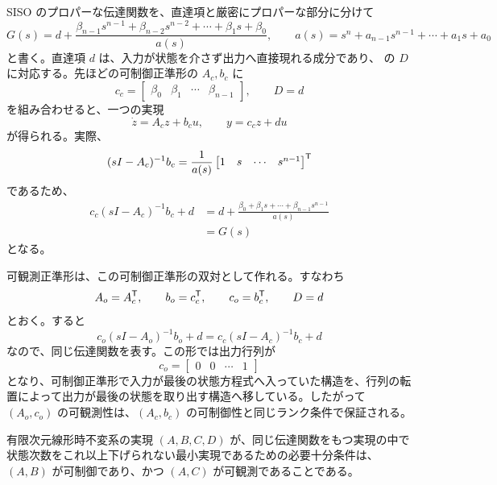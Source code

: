 SISO のプロパーな伝達関数を、直達項と厳密にプロパーな部分に分けて
\begin{equation}
  G(s)=d+
  \frac{\beta_{n-1}s^{n-1}+\beta_{n-2}s^{n-2}+\cdots+\beta_1s+\beta_0}
       {a(s)},\qquad
  a(s)=s^n+a_{n-1}s^{n-1}+\cdots+a_1s+a_0
  \label{eq:proper-transfer-split}
\end{equation}
と書く。直達項 $d$ は、入力が状態を介さず出力へ直接現れる成分であり、 の $D$ に対応する。先ほどの可制御正準形の $A_c,b_c$ に
\begin{equation}
  c_c=\begin{bmatrix}\beta_0&\beta_1&\cdots&\beta_{n-1}\end{bmatrix},
  \qquad D=d
\end{equation}
を組み合わせると、一つの実現
\begin{equation}
  \dot{z}=A_cz+b_cu,\qquad y=c_cz+du
\end{equation}
が得られる。実際、
\begin{equation}
  (sI-A_c)^{-1}b_c
  =\frac{1}{a(s)}
  \begin{bmatrix}1&s&\cdots&s^{n-1}\end{bmatrix}^{\mathsf{T}}
\end{equation}
であるため、
\begin{align}
  c_c(sI-A_c)^{-1}b_c+d
  &=d+
  \frac{\beta_0+\beta_1s+\cdots+\beta_{n-1}s^{n-1}}{a(s)}\\
  &=G(s)
\end{align}
となる。

可観測正準形は、この可制御正準形の双対として作れる。すなわち
\begin{equation}
  A_o=A_c^{\mathsf{T}},\qquad b_o=c_c^{\mathsf{T}},\qquad c_o=b_c^{\mathsf{T}},\qquad D=d
  \label{eq:observable-canonical-realization}
\end{equation}
とおく。すると
\begin{equation}
  c_o(sI-A_o)^{-1}b_o+d
  =
  c_c(sI-A_c)^{-1}b_c+d
\end{equation}
なので、同じ伝達関数を表す。この形では出力行列が
\begin{equation}
  c_o=\begin{bmatrix}0&0&\cdots&1\end{bmatrix}
\end{equation}
となり、可制御正準形で入力が最後の状態方程式へ入っていた構造を、行列の転置によって出力が最後の状態を取り出す構造へ移している。したがって $(A_o,c_o)$ の可観測性は、$(A_c,b_c)$ の可制御性と同じランク条件で保証される。

\begin{theorem}[最小実現の判定]
有限次元線形時不変系の実現 $(A,B,C,D)$ が、同じ伝達関数をもつ実現の中で状態次数をこれ以上下げられない最小実現であるための必要十分条件は、$(A,B)$ が可制御であり、かつ $(A,C)$ が可観測であることである。
\end{theorem}

